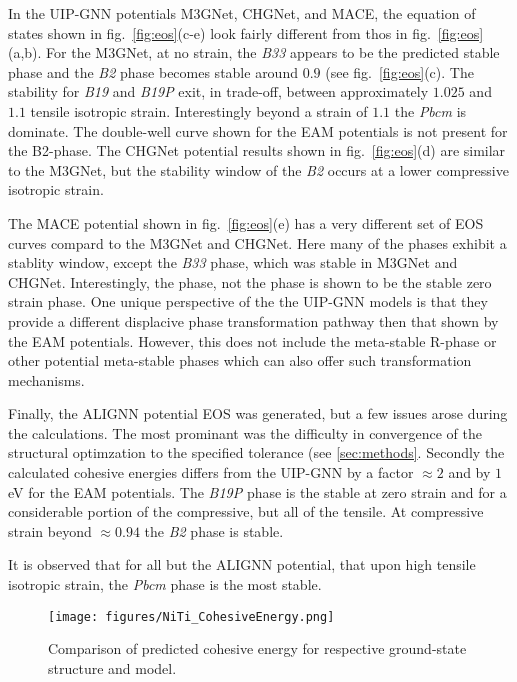 \documentclass[preprint]{elsarticle}
\begin{document}
In the UIP-GNN potentials M3GNet, CHGNet, and MACE, the equation of states shown in fig.~\ref{fig:eos}(c-e) look fairly different from thos in fig.~\ref{fig:eos}(a,b). For the M3GNet,  at no strain, the \textit{B33} appears to be the predicted stable phase and the \textit{B2} phase becomes stable around $0.9$ (see fig.~\ref{fig:eos}(c). The stability for \textit{B19} and \textit{B19P} exit, in trade-off, between approximately $1.025$ and $1.1$ tensile isotropic strain. Interestingly beyond a strain of $1.1$ the \textit{Pbcm} is dominate. The double-well curve shown for the EAM potentials is not present for the B2-phase. The CHGNet potential results shown in fig.~\ref{fig:eos}(d) are similar to the M3GNet, but the stability window of the \textit{B2} occurs at a lower compressive isotropic strain. \par

The MACE potential shown in fig.~\ref{fig:eos}(e) has a very different set of EOS curves compard to the M3GNet and CHGNet. Here many of the phases exhibit a stablity window, except the \textit{B33} phase, which was stable in M3GNet and CHGNet. Interestingly, the  phase, not the  phase is shown to be the stable zero strain phase. One unique perspective of the the UIP-GNN models is that they provide a different displacive phase transformation pathway then that shown by the EAM potentials. However, this does not include the meta-stable R-phase or other potential meta-stable phases which can also offer such transformation mechanisms. \par


Finally, the ALIGNN potential EOS was generated, but a few issues arose during the calculations. The most prominant was the difficulty in convergence of the structural optimzation to the specified tolerance (see \ref{sec:methods}. Secondly the calculated cohesive energies differs from the UIP-GNN by a factor $\approx 2$ and by $1$ eV for the EAM potentials. The \textit{B19P} phase is the stable at zero strain and for a considerable portion of the compressive, but all of the tensile. At compressive strain beyond $\approx 0.94$ the \textit{B2} phase is stable. 

It is observed that for all but the ALIGNN potential, that upon high tensile isotropic strain, the \textit{Pbcm} phase is the most stable. \par


\begin{figure}[ht!]
    \begin{centering}
        \texttt{[image: figures/NiTi\_CohesiveEnergy.png]}
        \caption{
          Comparison of predicted cohesive energy for respective ground-state structure and model.
        }
        \label{fig:ecoh}
    \end{centering}
\end{figure}
\end{document}

